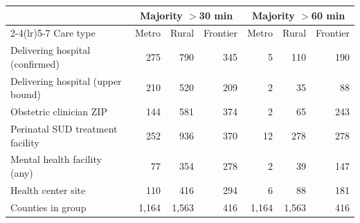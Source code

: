 \begin{tabular}{@{}lrrrrrr@{}}
\toprule
 & \multicolumn{3}{c}{Majority $>$30 min} & \multicolumn{3}{c}{Majority $>$60 min} \\
\cmidrule(lr){2-4}\cmidrule(lr){5-7}
Care type & Metro & Rural & Frontier & Metro & Rural & Frontier \\
\midrule
Delivering hospital (confirmed) & 275 & 790 & 345 & 5 & 110 & 190 \\
Delivering hospital (upper bound) & 210 & 520 & 209 & 2 & 35 & 88 \\
Obstetric clinician ZIP & 144 & 581 & 374 & 2 & 65 & 243 \\
Perinatal SUD treatment facility & 252 & 936 & 370 & 12 & 278 & 278 \\
Mental health facility (any) & 77 & 354 & 278 & 2 & 39 & 147 \\
Health center site & 110 & 416 & 294 & 6 & 88 & 181 \\
\midrule
Counties in group & 1{,}164 & 1{,}563 & 416 & 1{,}164 & 1{,}563 & 416 \\
\bottomrule
\end{tabular}
